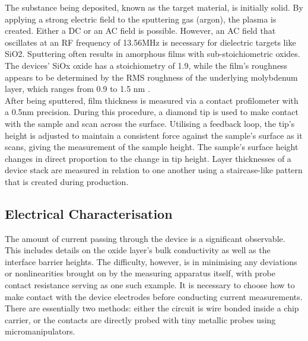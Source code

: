 \noindent  The substance being deposited, known as the target material, is initially solid. By applying a strong electric field to the sputtering gas (argon), the plasma is created. Either a DC or an AC field is possible. However, an AC field that oscillates at an RF frequency of 13.56MHz is necessary for dielectric targets like SiO2. Sputtering often results in amorphous films with sub-stoichiometric oxides. The devices' SiOx oxide has a stoichiometry of 1.9, while the film's roughness appears to be determined by the RMS roughness of the underlying molybdenum layer, which ranges from 0.9 to 1.5 nm \cite{kenyon2019interplay}. \\

\noindent After being sputtered, film thickness is measured via a contact profilometer with a 0.5nm precision. During this procedure, a diamond tip is used to make contact with the sample and scan across the surface. Utilising a feedback loop, the tip's height is adjusted to maintain a consistent force against the sample's surface as it scans, giving the measurement of the sample height. The sample's surface height changes in direct proportion to the change in tip height. Layer thicknesses of a device stack are measured in relation to one another using a staircase-like pattern that is created during production.

\subsection[Electrical Characterisation]{Electrical Characterisation}

The amount of current passing through the device is a significant observable. This includes details on the oxide layer's bulk conductivity as well as the interface barrier heights. The difficulty, however, is in minimising any deviations or nonlinearities brought on by the measuring apparatus itself, with probe contact resistance serving as one such example. It is necessary to choose how to make contact with the device electrodes before conducting current measurements. There are essentially two methods: either the circuit is wire bonded inside a chip carrier, or the contacts are directly probed with tiny metallic probes using micromanipulators. \\



